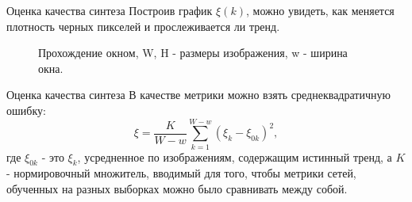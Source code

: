\documentclass[12pt]{beamer}
\begin{document}
	\begin{frame}{Оценка качества синтеза}
		Построив график $\xi(k)$, можно увидеть, как меняется плотность черных пикселей и прослеживается ли тренд.
		
		\begin{figure}[h!]
			\caption{Прохождение окном, W, H - размеры изображения, w - ширина окна.}
			\label{7-window}
		\end{figure}
	\end{frame}
	
	\begin{frame}{Оценка качества синтеза}
		В качестве метрики можно взять среднеквадратичную ошибку:
		$$ \xi = \frac{K}{W-w}\sum_{k=1}^{W-w} (\xi_k - \xi_{0k})^2,$$
		где $\xi_{0k}$ - это $\xi_k$, усредненное по изображениям, содержащим истинный тренд, а $K$ - нормировочный множитель, вводимый для того, чтобы метрики сетей, обученных на разных выборках можно было сравнивать между собой.
	\end{frame}
	
\end{document}
